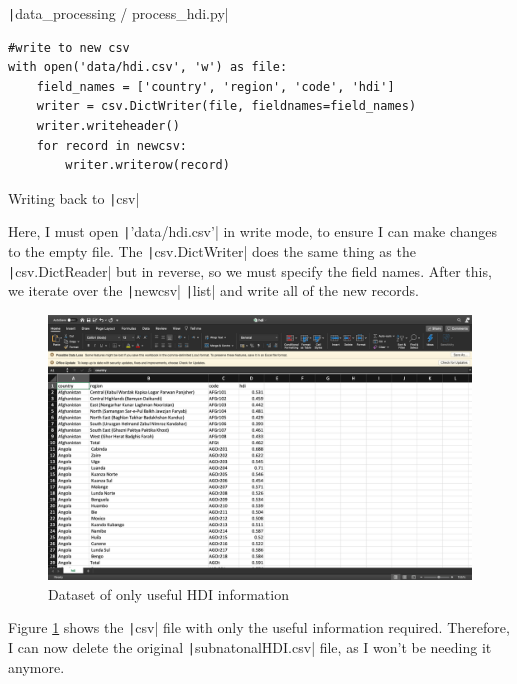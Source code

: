 \documentclass[12pt]{report}
\newcommand{\pil}[1]{\protect\texttt|#1|}
\begin{document}
\begin{listing}[H]
\pil{data_processing / process_hdi.py}
\begin{verbatim}
#write to new csv
with open('data/hdi.csv', 'w') as file:
    field_names = ['country', 'region', 'code', 'hdi']
    writer = csv.DictWriter(file, fieldnames=field_names)
    writer.writeheader()
    for record in newcsv:
        writer.writerow(record)
\end{verbatim}
\caption{Writing back to \pil{csv}}\label{cs:writingCSV}
\end{listing}
Here, I must open \pil{'data/hdi.csv'} in write mode, to ensure I can make changes to the empty file. The \pil{csv.DictWriter} does the same thing as the \pil{csv.DictReader} but in reverse, so we must specify the field names. After this, we iterate over the \pil{newcsv} \pil{list} and write all of the new records.

\begin{figure}[H]
\centering
\includegraphics[width=12cm]{ss1.3.png}
\caption{Dataset of only useful HDI information}\label{fig:ss1.3}
\end{figure}
Figure \ref{fig:ss1.3} shows the \pil{csv} file with only the useful information required. Therefore, I can now delete the original \pil{subnatonalHDI.csv} file, as I won't be needing it anymore.

\begin{center}
\end{center}
\end{document}
